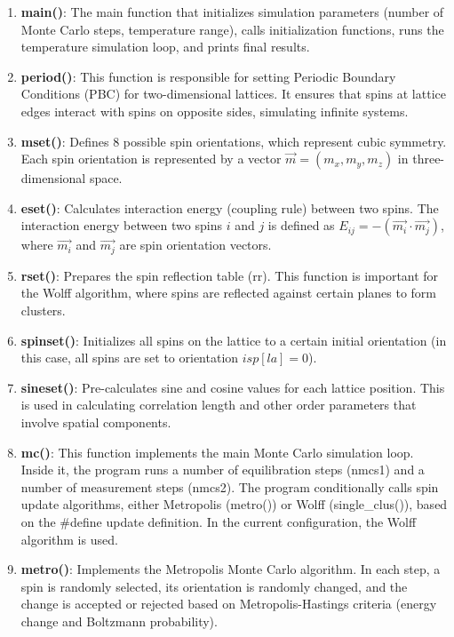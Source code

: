 \begin{enumerate}
\item \textbf{main()}: The main function that initializes simulation parameters (number of Monte Carlo steps, temperature range), calls initialization functions, runs the temperature simulation loop, and prints final results.

\item \textbf{period()}: This function is responsible for setting Periodic Boundary Conditions (PBC) for two-dimensional lattices. It ensures that spins at lattice edges interact with spins on opposite sides, simulating infinite systems.

\item \textbf{mset()}: Defines 8 possible spin orientations, which represent cubic symmetry. Each spin orientation is represented by a vector $\vec{m} = (m_x, m_y, m_z)$ in three-dimensional space.

\item \textbf{eset()}: Calculates interaction energy (coupling rule) between two spins. The interaction energy between two spins $i$ and $j$ is defined as $E_{ij} = -(\vec{m_i} \cdot \vec{m_j})$, where $\vec{m_i}$ and $\vec{m_j}$ are spin orientation vectors.

\item \textbf{rset()}: Prepares the spin reflection table (rr). This function is important for the Wolff algorithm, where spins are reflected against certain planes to form clusters.

\item \textbf{spinset()}: Initializes all spins on the lattice to a certain initial orientation (in this case, all spins are set to orientation $isp[la] = 0$).

\item \textbf{sineset()}: Pre-calculates sine and cosine values for each lattice position. This is used in calculating correlation length and other order parameters that involve spatial components.

\item \textbf{mc()}: This function implements the main Monte Carlo simulation loop. Inside it, the program runs a number of equilibration steps (nmcs1) and a number of measurement steps (nmcs2). The program conditionally calls spin update algorithms, either Metropolis (metro()) or Wolff (single\_clus()), based on the \#define update definition. In the current configuration, the Wolff algorithm is used.

\item \textbf{metro()}: Implements the Metropolis Monte Carlo algorithm. In each step, a spin is randomly selected, its orientation is randomly changed, and the change is accepted or rejected based on Metropolis-Hastings criteria (energy change and Boltzmann probability).


\end{enumerate}
